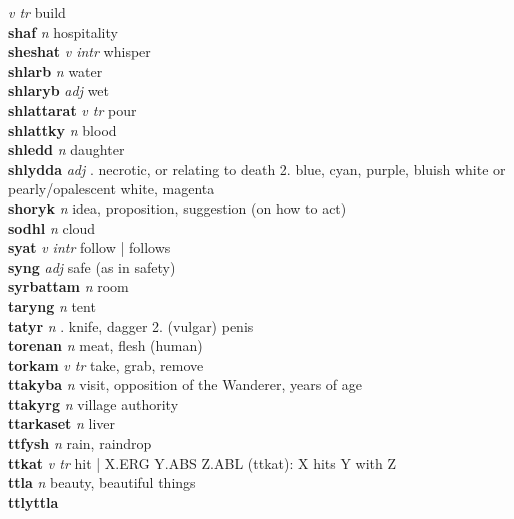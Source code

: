   \emph{v tr} \textperiodcentered build\\\textbf{shaf}   \emph{n} \textperiodcentered hospitality\\\textbf{sheshat}   \emph{v intr} \textperiodcentered whisper\\\textbf{shlarb}   \emph{n} \textperiodcentered water\\\textbf{shlaryb}   \emph{adj} \textperiodcentered wet\\\textbf{shlattarat}   \emph{v tr} \textperiodcentered pour\\\textbf{shlattky}   \emph{n} \textperiodcentered blood\\\textbf{shledd}   \emph{n} \textperiodcentered daughter\\\textbf{shlydda}   \emph{adj} . necrotic, or relating to death 2. blue, cyan, purple, bluish white or pearly/opalescent white, magenta \\\textbf{shoryk}   \emph{n} \textperiodcentered idea, proposition, suggestion (on how to act)\\\textbf{sodhl}   \emph{n} \textperiodcentered cloud\\\textbf{syat}   \emph{v intr} \textperiodcentered follow | \ABS follows \DAT\\\textbf{syng}   \emph{adj} \textperiodcentered safe (as in safety)\\\textbf{syrbattam}   \emph{n} \textperiodcentered room\\\textbf{taryng}   \emph{n} \textperiodcentered tent\\\textbf{tatyr}   \emph{n} . knife, dagger 2. (vulgar) penis \\\textbf{torenan}   \emph{n} \textperiodcentered meat, flesh (human)\\\textbf{torkam}   \emph{v tr} \textperiodcentered take, grab, remove\\\textbf{ttakyba}   \emph{n} \textperiodcentered visit, opposition of the Wanderer, years of age\\\textbf{ttakyrg}   \emph{n} \textperiodcentered village authority\\\textbf{ttarkaset}   \emph{n} \textperiodcentered liver\\\textbf{ttfysh}   \emph{n} \textperiodcentered rain, raindrop\\\textbf{ttkat}   \emph{v tr} \textperiodcentered hit | X.ERG Y.ABS Z.ABL (ttkat): X hits Y with Z\\\textbf{ttla}   \emph{n} \textperiodcentered beauty, beautiful things\\\textbf{ttlyttla} 